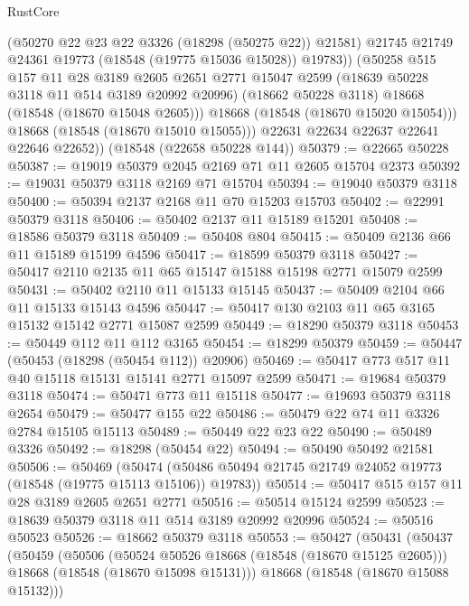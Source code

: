 \begin{lexlean}{RustCore}
\begin{coremodule}
                (@50270 @22 @23 @22 @3326 (@18298 (@50275 @22)) @21581)
                @21745
                @21749
                @24361
                @19773
                (@18548 (@19775 @15036 @15028))
                @19783))
            (@50258
              @515
              @157
              @11
              @28
              @3189
              @2605
              @2651
              @2771
              @15047
              @2599
              (@18639 @50228 @3118 @11 @514 @3189 @20992 @20996)
              (@18662 @50228 @3118)
              @18668
              (@18548 (@18670 @15048 @2605)))
            @18668
            (@18548 (@18670 @15020 @15054)))
          @18668
          (@18548 (@18670 @15010 @15055)))
        @22631
        @22634
        @22637
        @22641
        @22646
        @22652))
    (@18548 (@22658 @50228 @144))
@50379 := @22665 @50228
@50387 := @19019 @50379 @2045 @2169 @71 @11 @2605 @15704 @2373
@50392 := @19031 @50379 @3118 @2169 @71 @15704
@50394 := @19040 @50379 @3118
@50400 := @50394 @2137 @2168 @11 @70 @15203 @15703
@50402 := @22991 @50379 @3118
@50406 := @50402 @2137 @11 @15189 @15201
@50408 := @18586 @50379 @3118
@50409 := @50408 @804
@50415 := @50409 @2136 @66 @11 @15189 @15199 @4596
@50417 := @18599 @50379 @3118
@50427 := @50417 @2110 @2135 @11 @65 @15147 @15188 @15198 @2771 @15079 @2599
@50431 := @50402 @2110 @11 @15133 @15145
@50437 := @50409 @2104 @66 @11 @15133 @15143 @4596
@50447 := @50417 @130 @2103 @11 @65 @3165 @15132 @15142 @2771 @15087 @2599
@50449 := @18290 @50379 @3118
@50453 := @50449 @112 @11 @112 @3165
@50454 := @18299 @50379
@50459 := @50447 (@50453 (@18298 (@50454 @112)) @20906)
@50469 := @50417 @773 @517 @11 @40 @15118 @15131 @15141 @2771 @15097 @2599
@50471 := @19684 @50379 @3118
@50474 := @50471 @773 @11 @15118
@50477 := @19693 @50379 @3118 @2654
@50479 := @50477 @155 @22
@50486 := @50479 @22 @74 @11 @3326 @2784 @15105 @15113
@50489 := @50449 @22 @23 @22
@50490 := @50489 @3326
@50492 := @18298 (@50454 @22)
@50494 := @50490 @50492 @21581
@50506 := @50469
    (@50474 (@50486 @50494 @21745 @21749 @24052 @19773 (@18548 (@19775 @15113 @15106)) @19783))
@50514 := @50417 @515 @157 @11 @28 @3189 @2605 @2651 @2771
@50516 := @50514 @15124 @2599
@50523 := @18639 @50379 @3118 @11 @514 @3189 @20992 @20996
@50524 := @50516 @50523
@50526 := @18662 @50379 @3118
@50553 := @50427
    (@50431
      (@50437
        (@50459
          (@50506
            (@50524 @50526 @18668 (@18548 (@18670 @15125 @2605)))
            @18668
            (@18548 (@18670 @15098 @15131)))
          @18668
          (@18548 (@18670 @15088 @15132)))

\end{coremodule}
\end{lexlean}
